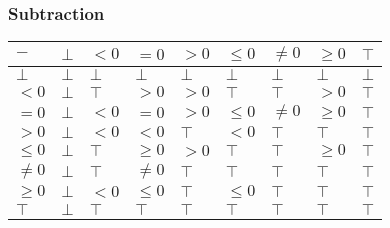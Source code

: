 \documentclass[aspectratio=169]{beamer}
\begin{document}
\begin{frame}
    \frametitle{Subtraction}
    \begin{table}[]
        \begin{tabular}{|l|l|l|l|l|l|l|l|l|}
        \hline
        $-$     & $\bot$ & $<0$   & $=0$    & $>0$   & $\le 0$ & $\ne 0$ & $\ge 0$ & $\top$ \\ \hline
        $\bot$  & $\bot$ & $\bot$ & $\bot$  & $\bot$ & $\bot$  & $\bot$  & $\bot$  & $\bot$ \\ \hline
        $<0$    & $\bot$ & $\top$ & $>0$    & $>0$   & $\top$  & $\top$  & $>0$    & $\top$ \\ \hline
        $=0$    & $\bot$ & $<0$   & $=0$    & $>0$   & $\le 0$ & $\ne 0$ & $\ge 0$ & $\top$ \\ \hline
        $>0$    & $\bot$ & $<0$   & $<0$    & $\top$ & $<0$    & $\top$  & $\top$  & $\top$ \\ \hline
        $\le 0$ & $\bot$ & $\top$ & $\ge 0$ & $>0$   & $\top$  & $\top$  & $\ge 0$ & $\top$ \\ \hline
        $\ne 0$ & $\bot$ & $\top$ & $\ne 0$ & $\top$ & $\top$  & $\top$  & $\top$  & $\top$ \\ \hline
        $\ge 0$ & $\bot$ & $<0$   & $\le 0$ & $\top$ & $\le 0$ & $\top$  & $\top$  & $\top$ \\ \hline
        $\top$  & $\bot$ & $\top$ & $\top$  & $\top$ & $\top$  & $\top$  & $\top$  & $\top$ \\ \hline
        \end{tabular}
        \end{table}
    \end{frame}
\end{document}
